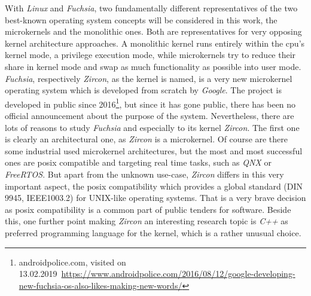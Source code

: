 With \textit{Linux} and \textit{Fuchsia}, two fundamentally different representatives of the two best-known operating system concepts will be considered in this work, the microkernels and the monolithic ones. %
Both are representatives for very opposing kernel architecture approaches.
A monolithic kernel runs entirely within the \ac{cpu}'s kernel mode, a privilege execution mode, while microkernels try to reduce their share in kernel mode and swap as much functionality as possible into user mode.
\textit{Fuchsia}, respectively \textit{Zircon}, as the kernel is named, is a very new microkernel operating system which is developed from scratch by \textit{Google}.
The project is developed in public since 2016\footnote{androidpolice.com, visited on 13.02.2019~\url{https://www.androidpolice.com/2016/08/12/google-developing-new-fuchsia-os-also-likes-making-new-words/}}, but since it has gone public, there has been no official announcement about the purpose of the system.
Nevertheless, there are lots of reasons to study \textit{Fuchsia} and especially to its kernel \textit{Zircon}.
The first one is clearly an architectural one, as \textit{Zircon} is a microkernel.
Of course are there some industrial used microkernel architectures, but the most and most successful ones are \ac{posix} compatible and targeting real time tasks, such as \textit{QNX} or \textit{FreeRTOS}. %
But apart from the unknown use-case, \textit{Zircon} differs in this very important aspect, the \ac{posix} compatibility which provides a global standard (DIN 9945, IEEE1003.2) for UNIX-like operating systems\cite{wolf2009c}.
That is a very brave decision as \ac{posix} compatibility is a common part of public tenders for software.
Beside this, one further point making \textit{Zircon} an interesting research topic is \textit{C++} as preferred programming language for the kernel, which is a rather unusual choice\cite{tanenbaum-modern-operating-systems}.

